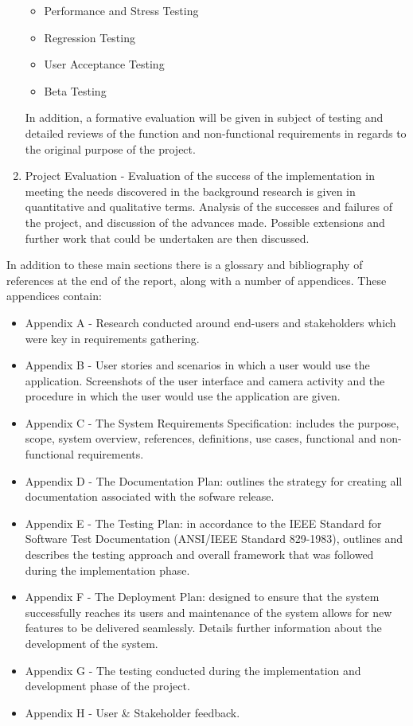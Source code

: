 \begin{enumerate}
\begin{itemize}
			\item Performance and Stress Testing
			\item Regression Testing
			\item User Acceptance Testing
			\item Beta Testing
		\end{itemize}
	In addition, a formative evaluation will be given in subject of testing and detailed reviews of the function and non-functional requirements in regards to the original purpose of the project.
	\item Project Evaluation - Evaluation of the success of the implementation in meeting the needs discovered in the background research is given in quantitative and qualitative terms. Analysis of the successes and failures of the project, and discussion of the advances made. Possible extensions and further work that could be undertaken are then discussed.
\end{enumerate}

In addition to these main sections there is a glossary and bibliography of references at the end of the report, along with a number of appendices. These appendices contain:

\begin{itemize}
	\item Appendix A - Research conducted around end-users and stakeholders which were key in requirements gathering.
	\item Appendix B - User stories and scenarios in which a user would use the application. Screenshots of the user interface and camera activity and the procedure in which the user would use the application are given.
	\item Appendix C - The System Requirements Specification: includes the purpose, scope, system overview, references, definitions, use cases, functional and non-functional requirements.
	\item Appendix D - The Documentation Plan: outlines the strategy for creating all documentation associated with the sofware release.
	\item Appendix E - The Testing Plan: in accordance to the IEEE Standard for Software Test Documentation (ANSI/IEEE Standard 829-1983), outlines and describes the testing approach and overall framework that was followed during the implementation phase.
	\item Appendix F - The Deployment Plan: designed to ensure that the system successfully reaches its users and maintenance of the system allows for new features to be delivered seamlessly. Details further information about the development of the system.
	\item Appendix G - The testing conducted during the implementation and development phase of the project.
	\item Appendix H - User \& Stakeholder feedback.
\end{itemize}